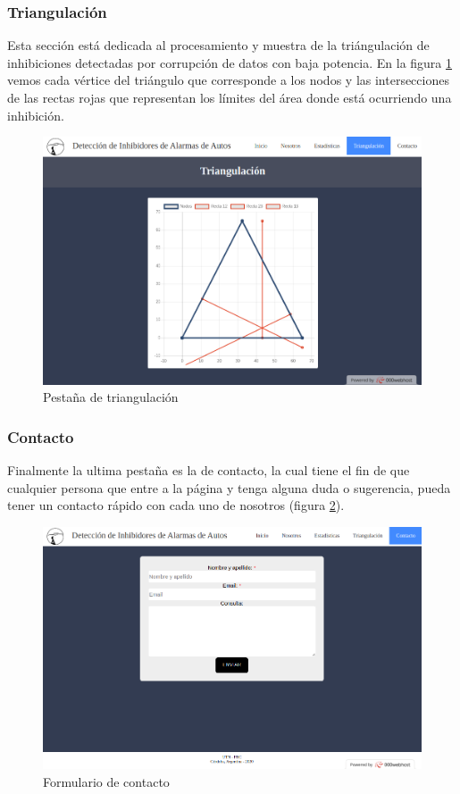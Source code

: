 \subsubsection{Triangulación}
\par Esta sección está dedicada al procesamiento y muestra de la triángulación de inhibiciones detectadas por corrupción de datos con baja potencia. En la figura \ref{web_triangulacion} vemos cada vértice del triángulo que corresponde a los nodos y las intersecciones de las rectas rojas que representan los límites del área donde está ocurriendo una inhibición. 

\begin{figure}[h!]
	\centering
	\includegraphics[scale=0.34]{images/web/triangulacion-web.png}
    \caption{Pestaña de triangulación}
	\label{web_triangulacion}
\end{figure}
\subsubsection{Contacto}
Finalmente la ultima pestaña es la de contacto, la cual tiene el fin de que cualquier persona que entre a la página y tenga alguna duda o sugerencia, pueda tener un contacto rápido con cada uno de nosotros (figura \ref{web_contacto}).
\begin{figure}[h!]
	\centering
	\includegraphics[scale=0.33]{images/web/contacto-web.png}
    \caption{Formulario de contacto}
	\label{web_contacto}
\end{figure}
